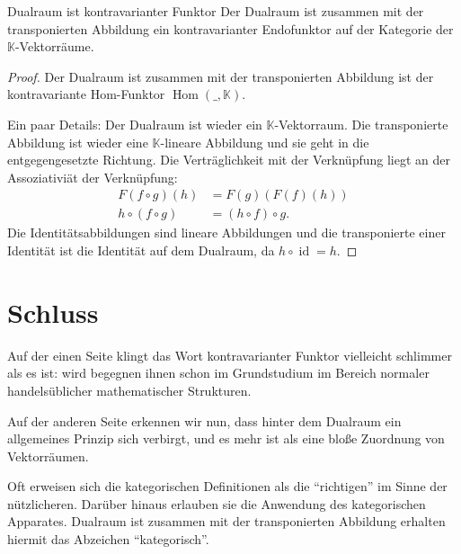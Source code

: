 \documentclass[a4paper]{amsart}
\theoremstyle{definition}
\DeclareMathOperator{\id}{id}
\DeclareMathOperator{\Hom}{Hom}
\newcommand{\K}{\ensuremath{\mathbb{ K }}}
\begin{document}
\begin{Theorem}{Dualraum ist kontravarianter Funktor}
   Der Dualraum ist zusammen mit der transponierten Abbildung ein kontravarianter Endofunktor auf der Kategorie der $\K$-Vektorräume.   
\end{Theorem}
\begin{proof}
   Der Dualraum ist zusammen mit der transponierten Abbildung ist der kontravariante Hom-Funktor 
   $\Hom( \_, \K )$.
   
   Ein paar Details: Der Dualraum ist wieder ein $\K$-Vektorraum. Die transponierte Abbildung ist wieder eine $\K$-lineare Abbildung und sie geht in die entgegengesetzte Richtung. Die Verträglichkeit mit der Verknüpfung liegt an der Assoziativiät der Verknüpfung:
   \begin{align}
      F( f \circ g )( h ) &= F(g)(F(f )(h))\\
      h \circ (f \circ g) &= (h \circ f) \circ g.
   \end{align}
   Die Identitätsabbildungen sind lineare Abbildungen und die transponierte einer Identität ist die Identität auf dem Dualraum, da $h \circ \id = h$.
\end{proof}

\section{Schluss}
Auf der einen Seite klingt das Wort kontravarianter Funktor vielleicht schlimmer als es ist: wird begegnen ihnen schon im Grundstudium im Bereich normaler handelsüblicher mathematischer Strukturen.

Auf der anderen Seite erkennen wir nun, dass hinter dem Dualraum ein allgemeines Prinzip sich verbirgt, und es mehr ist als eine bloße Zuordnung von Vektorräumen.

Oft erweisen sich die kategorischen Definitionen als die "`richtigen"' im Sinne der nützlicheren. Darüber hinaus erlauben sie die Anwendung des kategorischen Apparates. Dualraum ist zusammen mit der transponierten Abbildung erhalten hiermit das Abzeichen "`kategorisch"'.
\end{document}
